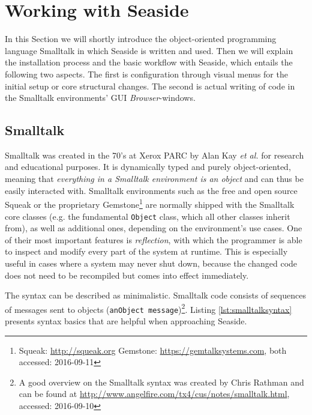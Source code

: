 \documentclass[a4paper,12pt,pagesize,headsepline,oribibl,titlepage]{scrartcl}
\begin{document}
\section{Working with Seaside}
\label{sec:workflow}

In this Section we will shortly introduce the object-oriented programming language Smalltalk in which Seaside is written and used. Then we will explain the installation process and the basic workflow with Seaside, which entails the following two aspects. The first is configuration through visual menus for the initial setup or core structural changes. The second is actual writing of code in the Smalltalk environments' GUI \emph{Browser}-windows\cite{perscheid2008introduction}.


\subsection{Smalltalk}

Smalltalk was created in the 70's at Xerox PARC by Alan Kay \emph{et al.} for research and educational purposes. It is dynamically typed and purely object-oriented, meaning that \emph{everything in a Smalltalk environment is an object} and can thus be easily interacted with. Smalltalk environments such as the free and open source Squeak or the proprietary Gemstone\footnote{Squeak: \url{http://squeak.org} Gemstone: \url{https://gemtalksystems.com}, both accessed: 2016-09-11} are normally shipped with the Smalltalk core classes (e.g. the fundamental \texttt{Object} class, which all other classes inherit from), as well as additional ones, depending on the environment's use cases. One of their most important features is \emph{reflection}, with which the programmer is able to inspect and modify every part of the system at runtime. This is especially useful in cases where a system may never shut down, because the changed code does not need to be recompiled but comes into effect immediately. 

The syntax can be described as minimalistic. Smalltalk code consists of sequences of messages sent to objects (\texttt{anObject message})\footnote{A good overview on the Smalltalk syntax was created by Chris Rathman and can be found at \url{http://www.angelfire.com/tx4/cus/notes/smalltalk.html}, accessed: 2016-09-10}. Listing \ref{lst:smalltalksyntax} presents syntax basics that are helpful when approaching Seaside.  
\end{document}
